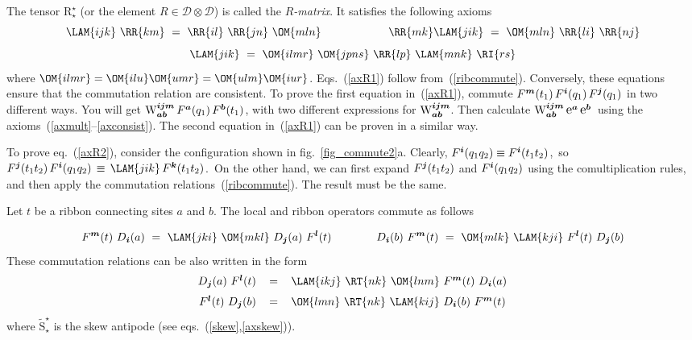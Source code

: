 \documentclass[12pt]{article}
\newcommand*{\epsfscale}[1]{\def\epsfsize##1##2{#1##1}}
\newcommand{\rE}{\mbox{\large$\mathrm e$}}
\newcommand{\rT}{\tilde{\mathrm{S}}}
\newcommand{\rR}{\mathrm{R}}
\newcommand*{\boldind}[1]{{\mbox{\scriptsize\boldmath$#1$}}}
\newcommand*{\RD}[1]{D_\boldind{#1}}
\newcommand*{\RF}[1]{F^\boldind{#1}}
\newcommand*{\RE}[1]{\rE^\boldind{#1}}
\newcommand{\calD}{\mathcal{D}}
\begin{document}
The tensor $\rR^\star_\star$ (or the element $R\in\calD\otimes\calD$) is
called the \emph{$R$-matrix}. It satisfies the following axioms
\begin{equation} \label{axR1}
  \LAM{ijk}\ \RR{km}\ =\ \RR{il}\ \RR{jn}\ \OM{mln} \qquad\qquad\qquad
  \RR{mk}\LAM{jik}\ =\ \OM{mln}\ \RR{li}\ \RR{nj}
\end{equation}
\begin{equation} \label{axR2}
  \LAM{jik}\ =\ \OM{i{lm}r}\ \OM{j{pn}s}\ \RR{lp}\ \LAM{mnk}\ \RI{rs}
\end{equation}
where $\OM{i{lm}r}=\OM{ilu}\OM{umr}=\OM{ulm}\OM{iur}$. Eqs.~(\ref{axR1})
follow from~(\ref{ribcommute}). Conversely, these equations ensure that the
commutation relation are consistent. To prove the first equation
in~(\ref{axR1}), commute $\RF{m}(t_1)\,\RF{i}(q_1)\,\RF{j}(q_1)$ in two
different ways. You will get
$\mathrm{W}^\boldind{ijm}_\boldind{ab}\,\RF{a}(q_1)\,\RF{b}(t_1)$, with two
different expressions for $\mathrm{W}^\boldind{ijm}_\boldind{ab}$. Then
calculate $\mathrm{W}^\boldind{ijm}_\boldind{ab}\,\RE{a}\,\RE{b}$\, using the
axioms~(\ref{axmult}--\ref{axconsist}). The second equation in~(\ref{axR1})
can be proven in a similar way.

To prove eq.~(\ref{axR2}), consider the configuration shown in
fig.~\ref{fig_commute2}a. Clearly, $\RF{i}(q_1q_2)\equiv\RF{i}(t_1t_2)$,\,
so\, $\RF{j}(t_1t_2)\,\RF{i}(q_1q_2)\,\equiv\,\LAM{jik}\,\RF{k}(t_1t_2)$.\, 
On the other hand, we can first expand $\RF{j}(t_1t_2)$ and $\RF{i}(q_1q_2)$
using the comultiplication rules, and then apply the commutation
relations~(\ref{ribcommute}). The result must be the same.

Let $t$ be a ribbon connecting sites $a$ and $b$. The local and ribbon 
operators commute as follows
\begin{figure}[h]
\centerline{\epsfscale{0.6}}
\end{figure}
\begin{equation} \label{commrel}
  \RF{m}(t)\ \RD{i}(a)\ =\ \LAM{jki}\ \OM{mkl}\ \RD{j}(a)\ \RF{l}(t)
  \qquad\qquad
  \RD{i}(b)\ \RF{m}(t)\ =\ \OM{mlk}\ \LAM{kji}\ \RF{l}(t)\ \RD{j}(b)
\end{equation}
These commutation relations can be also written in the form
\begin{equation}
  \begin{array}{rcl}
    \RD{j}(a)\ \RF{l}(t) &\,=\,&
    \LAM{ikj}\ \RT{nk}\ \OM{lnm}\ \RF{m}(t)\ \RD{i}(a) \medskip\\
    \RF{l}(t)\ \RD{j}(b) &\,=\,&
    \OM{lmn}\ \RT{nk}\ \LAM{kij}\ \RD{i}(b)\ \RF{m}(t)
  \end{array}
\end{equation}
where $\rT^\star_\star$ is the skew antipode 
(see eqs.~(\ref{skew},\ref{axskew})).
\end{document}
